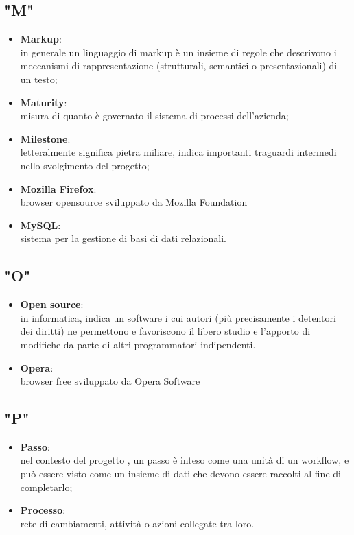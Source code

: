 \subsection{"M"}
\begin{itemize}
\item \textbf{Markup}:\\ in generale un linguaggio di markup è un insieme di regole che descrivono i meccanismi di rappresentazione (strutturali, semantici o presentazionali) di un testo;
\item \textbf{Maturity}:\\ misura di quanto è governato il sistema di processi dell'azienda;
\item \textbf{Milestone}:\\ letteralmente significa pietra miliare, indica importanti traguardi intermedi nello svolgimento del progetto;
\item \textbf{Mozilla Firefox}:\\ browser opensource sviluppato da Mozilla Foundation
\item \textbf{MySQL}:\\ sistema per la gestione di basi di dati relazionali.
\end{itemize}

\subsection{"O"}
\begin{itemize}
\item \textbf{Open source}:\\ in informatica, indica un software i cui autori (più precisamente i detentori dei diritti) ne permettono e favoriscono il libero studio e l'apporto di modifiche da parte di altri programmatori indipendenti.
\item \textbf{Opera}:\\ browser free sviluppato da Opera Software
\end{itemize}

\subsection{"P"}
\begin{itemize}
\item \textbf{Passo}:\\ nel contesto del progetto \progetto{}, un passo è inteso come una unità di un workflow, e può essere visto come un insieme di dati che devono essere raccolti al fine di completarlo;
\item \textbf{Processo}:\\ rete di cambiamenti, attività o azioni collegate tra loro.
\end{itemize}
